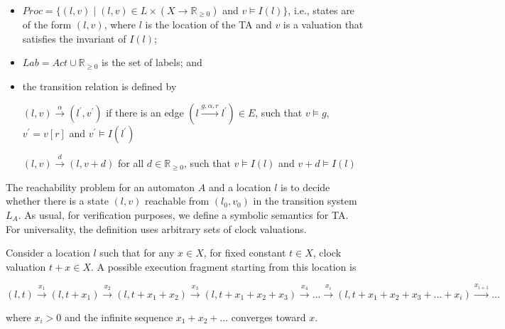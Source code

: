 \begin{itemize}
\item 
$Proc = \lbrace(l,v) \mid (l,v) \in L \times (X \rightarrow \mathbb{R}_{\geqslant{0}})$ and $v \models I(l) \rbrace$, i.e., states are of the form $(l,v)$, where $l$ is the location of the TA and $v$ is a valuation that satisfies the invariant of $I(l)$;
\item
$Lab = Act \cup \mathbb{R}_{\geqslant{0}}$ is the set of labels; and 
\item
the transition relation is defined by 

$(l,v) \xrightarrow{\alpha} (l^{\prime},v^{\prime})$ if there is an edge $(l \xrightarrow{g,\alpha,r} l^{\prime}) \in E$, such that $v \models g$, $v^{\prime} = v[r]$ and $v^{\prime} \models I(l^{\prime})$

$(l,v) \xrightarrow{d} (l,v+d)$ for all $d \in  \mathbb{R}_{\geqslant{0}}$, such that $v \models I(l)$ and $v + d \models I(l)$
\end{itemize}
The reachability problem for an automaton $A$ and a location $l$ is to decide whether there is a state $(l,v)$ reachable from $(l_{0},v_{0})$ in the transition system $L_{A}$. As usual, for verification purposes, we define a symbolic semantics for TA. For universality, the definition uses arbitrary sets of clock valuations.

Consider a location $l$ such that for any $x \in X$, for fixed constant $t \in X$, clock valuation $t + x \in X$. A possible execution fragment starting from this location is

$(l,t) \xrightarrow{x_{1}} (l,t+x_{1}) \xrightarrow{x_{2}} (l,t+x_{1}+x_{2}) \xrightarrow{x_{3}} (l,t+x_{1}+x_{2}+x_{3}) \xrightarrow{x_{4}}...\xrightarrow{x_{i}}(l,t+x_{1}+x_{2}+x_{3}+...+x_{i}) \xrightarrow{x_{i+1}}...$

where $x_{i} > 0$ and the infinite sequence $x_{1} + x_{2} + . . .$ converges toward $x$. 





